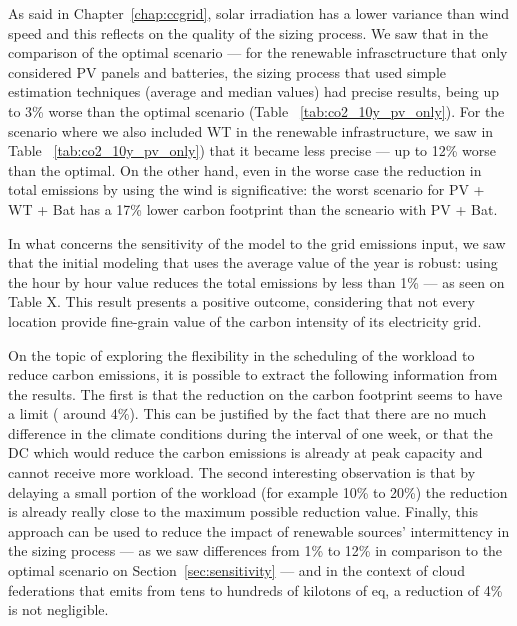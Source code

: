 
As said in Chapter~\ref{chap:ccgrid}, solar irradiation has a lower variance than wind speed and this reflects on the quality of the sizing process. We saw that in the comparison of the optimal scenario --- for the renewable infrasctructure that only considered PV panels and batteries, the sizing process that used simple estimation techniques (average and median values) had precise results, being up to 3\% worse than the optimal scenario (Table ~\ref{tab:co2_10y_pv_only}). For the scenario where we also included WT in the renewable infrastructure, we saw in Table ~\ref{tab:co2_10y_pv_only}) that it became less precise --- up to 12\% worse than the optimal. On the other hand, even in the worse case the reduction in total  emissions by using the wind is significative: the worst scenario for PV + WT + Bat has a 17\% lower carbon footprint than the scneario with PV + Bat.

In what concerns the sensitivity of the model to the grid emissions input, we saw that the initial modeling that uses the average value  of the year is robust: using the hour by hour value reduces the total  emissions  by less than 1\% --- as seen on Table X. This result presents a positive outcome, considering that not every location provide fine-grain value of the carbon intensity of its electricity grid.

On the topic of exploring the flexibility in the scheduling of the workload to reduce carbon emissions, it is possible to extract the following information from the results. The first is that the reduction on the carbon footprint seems to have a limit ( around 4\%). This can be justified by the fact that there are no much difference in the climate conditions during the interval of one week, or that the DC which would reduce the carbon emissions is already at peak capacity and cannot receive more workload. The second interesting observation is that by delaying a small portion of the workload (for example 10\% to 20\%)  the reduction is already really close to the maximum possible reduction value. Finally, this approach can be used to reduce the impact of renewable sources' intermittency in the sizing process --- as we saw differences from 1\% to 12\% in comparison to the optimal scenario  on Section~\ref{sec:sensitivity} --- and in the context of cloud federations that emits from tens to hundreds of kilotons of  eq, a reduction of 4\% is not negligible.

